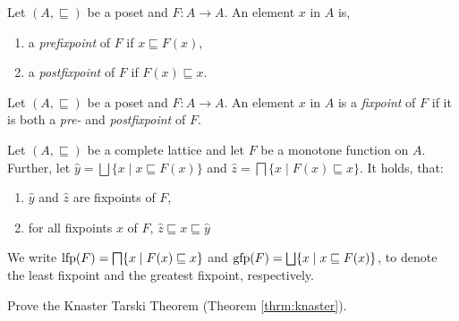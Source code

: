 \begin{definition}
Let $(A, \sqsubseteq)$ be a poset and $F: A \to A$. An element $x$ in $A$ is,
\begin{enumerate}
  \item a \emph{prefixpoint} of $F$ if $x \sqsubseteq F(x)$,
  \item a \emph{postfixpoint} of $F$ if $F(x) \sqsubseteq x$.
\end{enumerate}
\end{definition}

\begin{definition}[Fixpoint]
Let $(A, \sqsubseteq)$ be a poset and $F: A \to A$. An element $x$ in $A$ is a \emph{fixpoint} of $F$ if it is both a \emph{pre-} and \emph{postfixpoint} of $F$.
\end{definition}

\begin{theorem}
\label{thrm:knaster}
    Let $(A,\sqsubseteq)$ be a complete lattice and let $F$ be a monotone function on $A$.
    Further, let $\hat{y} = \bigsqcup \{x \mid x \sqsubseteq F(x)\}$ and $\hat{z} = \bigsqcap\{x \mid F(x) \sqsubseteq x\}$.
    It holds, that:
    \begin{enumerate}
      \item $\hat{y}$ and $\hat{z}$ are fixpoints of $F$,
      \item for all fixpoints $x$ of $F$, $\hat{z} \sqsubseteq x \sqsubseteq \hat{y}$
    \end{enumerate}
\end{theorem}

{\flushleft We write $\mathrm{lfp}(F) = \bigsqcap\{x \mid F(x)\sqsubseteq x\}$ and $\mathrm{gfp}(F) = \bigsqcup\{x \mid x \sqsubseteq F(x)\}$, to denote the least fixpoint and the greatest fixpoint, respectively.}

\begin{exercise}
        Prove the Knaster Tarski Theorem (Theorem \ref{thrm:knaster}).
\end{exercise}


